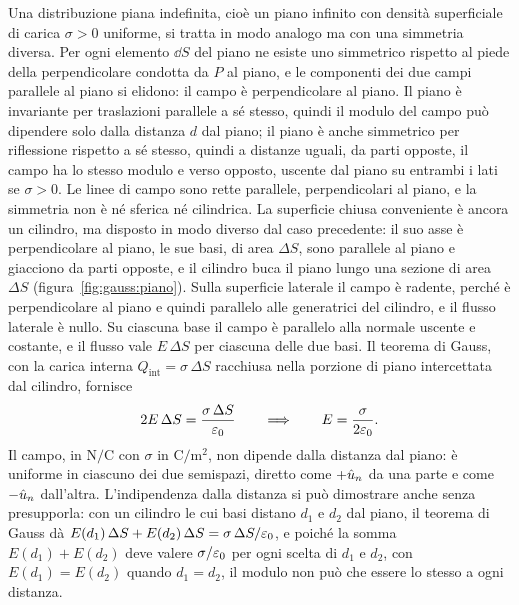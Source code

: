 \documentclass[11pt,a4paper]{article}
\begin{document}
Una distribuzione piana indefinita, cioè un piano infinito con densità superficiale di carica $\sigma>0$ uniforme, si tratta in modo analogo ma con una simmetria diversa. Per ogni elemento $\dd S$ del piano ne esiste uno simmetrico rispetto al piede della perpendicolare condotta da $P$ al piano, e le componenti dei due campi parallele al piano si elidono: il campo è perpendicolare al piano. Il piano è invariante per traslazioni parallele a sé stesso, quindi il modulo del campo può dipendere solo dalla distanza $d$ dal piano; il piano è anche simmetrico per riflessione rispetto a sé stesso, quindi a distanze uguali, da parti opposte, il campo ha lo stesso modulo e verso opposto, uscente dal piano su entrambi i lati se $\sigma>0$. Le linee di campo sono rette parallele, perpendicolari al piano, e la simmetria non è né sferica né cilindrica. La superficie chiusa conveniente è ancora un cilindro, ma disposto in modo diverso dal caso precedente: il suo asse è perpendicolare al piano, le sue basi, di area $\Delta S$, sono parallele al piano e giacciono da parti opposte, e il cilindro buca il piano lungo una sezione di area $\Delta S$ (figura~\ref{fig:gauss:piano}). Sulla superficie laterale il campo è radente, perché è perpendicolare al piano e quindi parallelo alle generatrici del cilindro, e il flusso laterale è nullo. Su ciascuna base il campo è parallelo alla normale uscente e costante, e il flusso vale $E\,\Delta S$ per ciascuna delle due basi. Il teorema di Gauss, con la carica interna $Q_{\mathrm{int}}=\sigma\,\Delta S$ racchiusa nella porzione di piano intercettata dal cilindro, fornisce
\[
2E\,\Delta S=\frac{\sigma\,\Delta S}{\varepsilon_0}
\qquad\Longrightarrow\qquad
E=\frac{\sigma}{2\varepsilon_0}.
\]
Il campo, in $\mathrm{N/C}$ con $\sigma$ in $\mathrm{C/m^2}$, non dipende dalla distanza dal piano: è uniforme in ciascuno dei due semispazi, diretto come $+\hat{u}_n$ da una parte e come $-\hat{u}_n$ dall'altra.
L'indipendenza dalla distanza si può dimostrare anche senza presupporla: con un cilindro le cui basi distano $d_1$ e $d_2$ dal piano, il teorema di Gauss dà $E(d_1)\,\Delta S+E(d_2)\,\Delta S=\sigma\,\Delta S/\varepsilon_0$, e poiché la somma $E(d_1)+E(d_2)$ deve valere $\sigma/\varepsilon_0$ per ogni scelta di $d_1$ e $d_2$, con $E(d_1)=E(d_2)$ quando $d_1=d_2$, il modulo non può che essere lo stesso a ogni distanza.
\end{document}
